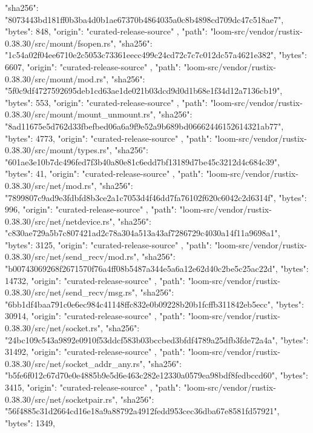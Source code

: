 {{      "sha256": "8073443bd181ff0b3ba4d0b1ae67370b4864035a0c8b4898cd709dc47c518ae7",
      "bytes": 848,
      "origin": "curated-release-source"
    },
    {
      "path": "loom-src/vendor/rustix-0.38.30/src/mount/fsopen.rs",
      "sha256": "1c54a02f04ee6710e2c5053c73361eecc499c24cd72c7c7c012dc57a4621e382",
      "bytes": 6607,
      "origin": "curated-release-source"
    },
    {
      "path": "loom-src/vendor/rustix-0.38.30/src/mount/mod.rs",
      "sha256": "5f0c9df4727592695deb1cd63ae1de021b03dcd9d0d1b68e1f34d12a7136cb19",
      "bytes": 553,
      "origin": "curated-release-source"
    },
    {
      "path": "loom-src/vendor/rustix-0.38.30/src/mount/mount_unmount.rs",
      "sha256": "8ad11675e5d762d33fbefbed06a6a9f9e52a9b689bd06662446152614321ab77",
      "bytes": 4773,
      "origin": "curated-release-source"
    },
    {
      "path": "loom-src/vendor/rustix-0.38.30/src/mount/types.rs",
      "sha256": "601ae3e10b7dc496fed7f3b40a80e81c6edd7bf13189d7be45c3212d4c684c39",
      "bytes": 41,
      "origin": "curated-release-source"
    },
    {
      "path": "loom-src/vendor/rustix-0.38.30/src/net/mod.rs",
      "sha256": "7899807c9ad9e3fdbfd8b3ce2a1c7053d4f46dd7fa76102f620c6042c2d6314f",
      "bytes": 996,
      "origin": "curated-release-source"
    },
    {
      "path": "loom-src/vendor/rustix-0.38.30/src/net/netdevice.rs",
      "sha256": "c830ae729a5b7c807421ad2c78a304a513a43af7286729c4030a14f11a9698a1",
      "bytes": 3125,
      "origin": "curated-release-source"
    },
    {
      "path": "loom-src/vendor/rustix-0.38.30/src/net/send_recv/mod.rs",
      "sha256": "b00743069268f2671570f76a4ff08b5487a344e5a6a12e62d40c2be5c25ac22d",
      "bytes": 14732,
      "origin": "curated-release-source"
    },
    {
      "path": "loom-src/vendor/rustix-0.38.30/src/net/send_recv/msg.rs",
      "sha256": "6bb1df4baa791c0e6ec984c41148ffc832e0b09228b20b1fcffb311842eb5ecc",
      "bytes": 30914,
      "origin": "curated-release-source"
    },
    {
      "path": "loom-src/vendor/rustix-0.38.30/src/net/socket.rs",
      "sha256": "24bc109c543a9892e0910f53ddcf583b03bccbed3bfdf4789a25dfb3fde72a4a",
      "bytes": 31492,
      "origin": "curated-release-source"
    },
    {
      "path": "loom-src/vendor/rustix-0.38.30/src/net/socket_addr_any.rs",
      "sha256": "b5fe6f012c67d70e0e4885b9e5d6e463c282e12330a0579ea98bdf8fedbccd60",
      "bytes": 3415,
      "origin": "curated-release-source"
    },
    {
      "path": "loom-src/vendor/rustix-0.38.30/src/net/socketpair.rs",
      "sha256": "56f4885c31d2664cd16e18a9a88792a4912fedd953cec36dba67e8581fd57921",
      "bytes": 1349,
}}

